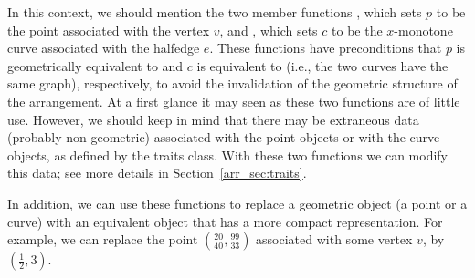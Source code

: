In this context, we should mention the two member functions
, which sets $p$ to be the point
associated with the vertex $v$, and , which
sets $c$ to be the $x$-monotone curve associated with the halfedge
$e$. These functions have preconditions that $p$ is
geometrically equivalent to  and $c$ is equivalent
to  (i.e., the two curves have the same graph),
respectively, to avoid the invalidation of the geometric structure of
the arrangement. At a first glance it may seen as these two functions
are of little use. However, we should keep in mind that there may be
extraneous data (probably non-geometric) associated with the point
objects or with the curve objects, as defined by the traits class. With
these two functions we can modify this data; see more details in
Section~\ref{arr_sec:traits}.

In addition, we can use these functions to replace a geometric
object (a point or a curve) with an equivalent object that has a
more compact representation. For example, we can replace the point
$(\frac{20}{40}, \frac{99}{33})$ associated with some vertex $v$,
by $(\frac{1}{2}, 3)$.

